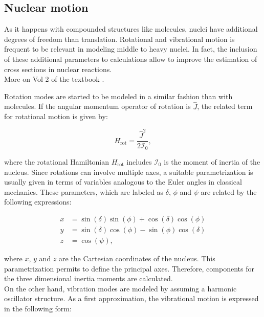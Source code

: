 \documentclass[openany]{book}
\begin{document}
\subsection{Nuclear motion}  \label{sub:nuclearMotion}

As it happens with compounded structures like molecules, nuclei have additional degrees of freedom than translation. Rotational and vibrational motion is frequent to be relevant in modeling middle to heavy nuclei. In fact, the inclusion of these additional parameters to calculations allow to improve the estimation of cross sections in nuclear reactions.  \\

More on Vol 2 of the textbook \cite{bohr_mottelson_1998}.

Rotation modes are started to be modeled in a similar fashion than with molecules. If the angular momentum operator of rotation is $\hat J$, the related term for rotational motion is given by:

\begin{equation}\label{eq:nuclearMotion_rotation}
	H_{\mathrm{rot}} =  \frac{\hat J^2}{2\mathcal{I}_0},
\end{equation}

where the rotational Hamiltonian $H_{\mathrm{rot}}$ includes $\mathcal{I}_0$ is the moment of inertia of the nucleus. Since rotations can involve multiple axes, a suitable parametrization is usually given in terms of variables analogous to the Euler angles in classical mechanics. These parameters, which are labeled as $\delta$, $\phi$ and $\psi$ are related by the following expressions: 

\begin{equation}\label{eq:nuclearMotion_angles}
	\begin{split}
		x &=  \sin {(\delta)} \sin{(\phi)}  + \cos {(\delta)} \cos {(\phi)} \\
		y &= \sin {(\delta)} \cos {(\phi)} - \sin {(\phi)} \cos {(\delta)} \\
		z &= \cos {(\psi)},
	\end{split}
\end{equation}

where $x$, $y$ and $z$ are the Cartesian coordinates of the nucleus. This parametrization permits to define the principal axes. Therefore, components for the three dimensional inertia moments are calculated. \\

On the other hand, vibration modes are modeled by assuming a harmonic oscillator structure. As a first approximation, the vibrational motion is expressed in the following form:  
\end{document}

